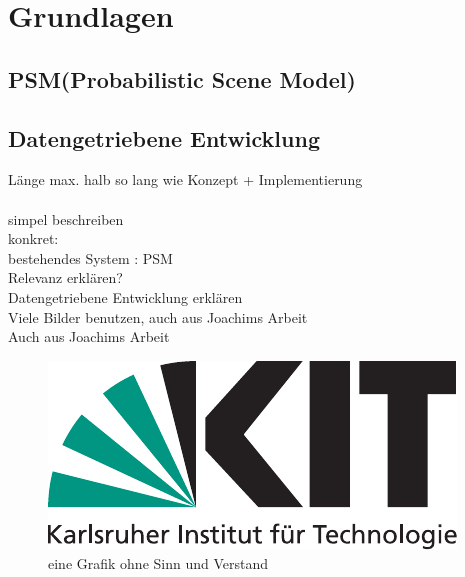 \chapter{Grundlagen}\label{ch:grundlagen}

\section{PSM(Probabilistic Scene Model)}
\section{Datengetriebene Entwicklung}

Länge max. halb so lang wie Konzept + Implementierung\\
\\
simpel beschreiben\\
konkret:\\
bestehendes System : PSM\\
Relevanz erklären?\\
Datengetriebene Entwicklung erklären \\
Viele Bilder benutzen, auch aus Joachims Arbeit\\
Auch aus Joachims Arbeit \\

\begin{figure}
	\centering
	\includegraphics{bilder/Kitlogo_de_rgb.pdf}
	\caption{eine Grafik ohne Sinn und Verstand}
	\label{img:grafik-dummy}
\end{figure}

\begin{deprecated}
\cite{gehrung14}


\end{deprecated}
